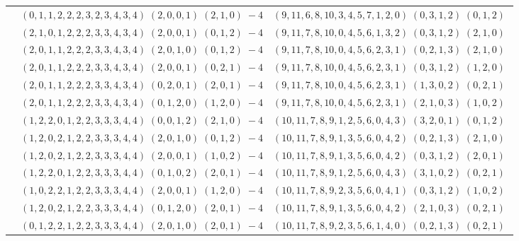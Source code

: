 \documentclass[11pt]{article}
\begin{document}
\begin{longtable}[l]{|c|c|c|}
 \cline{2-3} 
 & $(0 ,1 ,1 ,2 ,2 ,2 ,3 ,2 ,3 ,4 ,3 ,4) \;(2 ,0 ,0 ,1) \;(2 ,1 ,0) \;-4$ & $(9 ,11 ,6 ,8 ,10 ,3 ,4 ,5 ,7 ,1 ,2 ,0) \;(0 ,3 ,1 ,2) \;(0 ,1 ,2) \;$\\ 
 \cline{2-3} 
 & $(2 ,1 ,0 ,1 ,2 ,2 ,2 ,3 ,3 ,4 ,3 ,4) \;(2 ,0 ,0 ,1) \;(0 ,1 ,2) \;-4$ & $(9 ,11 ,7 ,8 ,10 ,0 ,4 ,5 ,6 ,1 ,3 ,2) \;(0 ,3 ,1 ,2) \;(2 ,1 ,0) \;$\\ 
 \cline{2-3} 
 & $(2 ,0 ,1 ,1 ,2 ,2 ,2 ,3 ,3 ,4 ,3 ,4) \;(2 ,0 ,1 ,0) \;(0 ,1 ,2) \;-4$ & $(9 ,11 ,7 ,8 ,10 ,0 ,4 ,5 ,6 ,2 ,3 ,1) \;(0 ,2 ,1 ,3) \;(2 ,1 ,0) \;$\\ 
 \cline{2-3} 
 & $(2 ,0 ,1 ,1 ,2 ,2 ,2 ,3 ,3 ,4 ,3 ,4) \;(2 ,0 ,0 ,1) \;(0 ,2 ,1) \;-4$ & $(9 ,11 ,7 ,8 ,10 ,0 ,4 ,5 ,6 ,2 ,3 ,1) \;(0 ,3 ,1 ,2) \;(1 ,2 ,0) \;$\\ 
 \cline{2-3} 
 & $(2 ,0 ,1 ,1 ,2 ,2 ,2 ,3 ,3 ,4 ,3 ,4) \;(0 ,2 ,0 ,1) \;(2 ,0 ,1) \;-4$ & $(9 ,11 ,7 ,8 ,10 ,0 ,4 ,5 ,6 ,2 ,3 ,1) \;(1 ,3 ,0 ,2) \;(0 ,2 ,1) \;$\\ 
 \cline{2-3} 
 & $(2 ,0 ,1 ,1 ,2 ,2 ,2 ,3 ,3 ,4 ,3 ,4) \;(0 ,1 ,2 ,0) \;(1 ,2 ,0) \;-4$ & $(9 ,11 ,7 ,8 ,10 ,0 ,4 ,5 ,6 ,2 ,3 ,1) \;(2 ,1 ,0 ,3) \;(1 ,0 ,2) \;$\\ 
 \cline{2-3} 
 & $(1 ,2 ,2 ,0 ,1 ,2 ,2 ,3 ,3 ,3 ,4 ,4) \;(0 ,0 ,1 ,2) \;(2 ,1 ,0) \;-4$ & $(10 ,11 ,7 ,8 ,9 ,1 ,2 ,5 ,6 ,0 ,4 ,3) \;(3 ,2 ,0 ,1) \;(0 ,1 ,2) \;$\\ 
 \cline{2-3} 
 & $(1 ,2 ,0 ,2 ,1 ,2 ,2 ,3 ,3 ,3 ,4 ,4) \;(2 ,0 ,1 ,0) \;(0 ,1 ,2) \;-4$ & $(10 ,11 ,7 ,8 ,9 ,1 ,3 ,5 ,6 ,0 ,4 ,2) \;(0 ,2 ,1 ,3) \;(2 ,1 ,0) \;$\\ 
 \cline{2-3} 
 & $(1 ,2 ,0 ,2 ,1 ,2 ,2 ,3 ,3 ,3 ,4 ,4) \;(2 ,0 ,0 ,1) \;(1 ,0 ,2) \;-4$ & $(10 ,11 ,7 ,8 ,9 ,1 ,3 ,5 ,6 ,0 ,4 ,2) \;(0 ,3 ,1 ,2) \;(2 ,0 ,1) \;$\\ 
 \cline{2-3} 
 & $(1 ,2 ,2 ,0 ,1 ,2 ,2 ,3 ,3 ,3 ,4 ,4) \;(0 ,1 ,0 ,2) \;(2 ,0 ,1) \;-4$ & $(10 ,11 ,7 ,8 ,9 ,1 ,2 ,5 ,6 ,0 ,4 ,3) \;(3 ,1 ,0 ,2) \;(0 ,2 ,1) \;$\\ 
 \cline{2-3} 
 & $(1 ,0 ,2 ,2 ,1 ,2 ,2 ,3 ,3 ,3 ,4 ,4) \;(2 ,0 ,0 ,1) \;(1 ,2 ,0) \;-4$ & $(10 ,11 ,7 ,8 ,9 ,2 ,3 ,5 ,6 ,0 ,4 ,1) \;(0 ,3 ,1 ,2) \;(1 ,0 ,2) \;$\\ 
 \cline{2-3} 
 & $(1 ,2 ,0 ,2 ,1 ,2 ,2 ,3 ,3 ,3 ,4 ,4) \;(0 ,1 ,2 ,0) \;(2 ,0 ,1) \;-4$ & $(10 ,11 ,7 ,8 ,9 ,1 ,3 ,5 ,6 ,0 ,4 ,2) \;(2 ,1 ,0 ,3) \;(0 ,2 ,1) \;$\\ 
 \cline{2-3} 
 & $(0 ,1 ,2 ,2 ,1 ,2 ,2 ,3 ,3 ,3 ,4 ,4) \;(2 ,0 ,1 ,0) \;(2 ,0 ,1) \;-4$ & $(10 ,11 ,7 ,8 ,9 ,2 ,3 ,5 ,6 ,1 ,4 ,0) \;(0 ,2 ,1 ,3) \;(0 ,2 ,1) \;$\\ 

\end{longtable}
\end{document}
